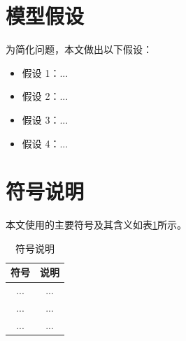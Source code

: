 \section{模型假设}
为简化问题，本文做出以下假设：
\begin{itemize}
	\item 假设 1：...
	\item 假设 2：...
	\item 假设 3：...
	\item 假设 4：...
\end{itemize}

\section{符号说明}
本文使用的主要符号及其含义如表\ref{tab:symbols}所示。

\begin{table}[htbp]
	\caption{符号说明}
	\label{tab:symbols}
	\centering
	\begin{tabular}{cc}
		\toprule
		符号 & 说明 \\
		\midrule
		... & ... \\
		... & ... \\
		... & ... \\
		\bottomrule
	\end{tabular}
\end{table}
